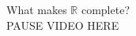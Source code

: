 \documentclass[preview]{standalone}
\begin{document}
\begin{center}
What makes $\mathbb{R}$ complete?\\PAUSE VIDEO HERE
\end{center}
\end{document}
